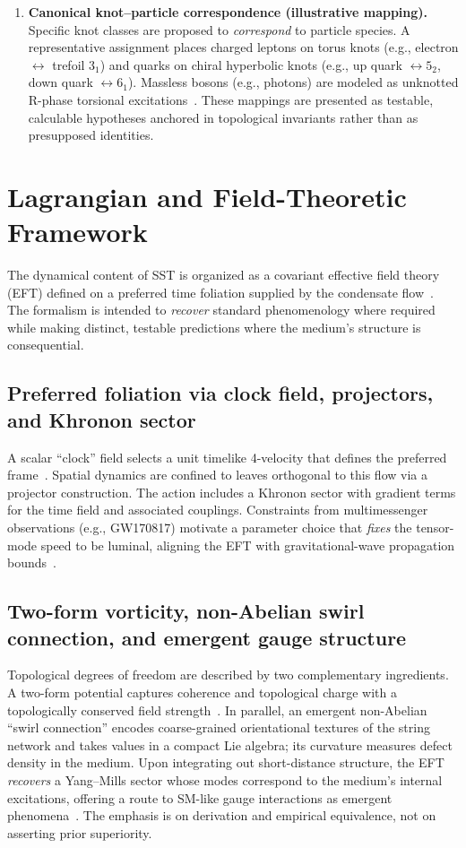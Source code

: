 \documentclass[10pt,reprint,aps,onecolumn,nofootinbib]{revtex4-2}
\begin{document}
\begin{enumerate}
        \item \textbf{Canonical knot–particle correspondence (illustrative mapping).} Specific knot classes are proposed to \emph{correspond} to particle species. A representative assignment places charged leptons on torus knots (e.g., electron $\leftrightarrow$ trefoil $3_1$) and quarks on chiral hyperbolic knots (e.g., up quark $\leftrightarrow 5_2$, down quark $\leftrightarrow 6_1$). Massless bosons (e.g., photons) are modeled as unknotted R-phase torsional excitations~\cite{1,4}. These mappings are presented as testable, calculable hypotheses anchored in topological invariants rather than as presupposed identities.
        \end{enumerate}

\section{Lagrangian and Field-Theoretic Framework}
    \label{sec:lagrangian}
    The dynamical content of SST is organized as a covariant effective field theory (EFT) defined on a preferred time foliation supplied by the condensate flow~\cite{4}. The formalism is intended to \emph{recover} standard phenomenology where required while making distinct, testable predictions where the medium’s structure is consequential.

    \subsection*{Preferred foliation via clock field, projectors, and Khronon sector}
        A scalar ``clock'' field selects a unit timelike 4-velocity that defines the preferred frame~\cite{4}. Spatial dynamics are confined to leaves orthogonal to this flow via a projector construction. The action includes a Khronon sector with gradient terms for the time field and associated couplings. Constraints from multimessenger observations (e.g., GW170817) motivate a parameter choice that \emph{fixes} the tensor-mode speed to be luminal, aligning the EFT with gravitational-wave propagation bounds~\cite{4}.

    \subsection*{Two-form vorticity, non-Abelian swirl connection, and emergent gauge structure}
        Topological degrees of freedom are described by two complementary ingredients. A two-form potential captures coherence and topological charge with a topologically conserved field strength~\cite{4}. In parallel, an emergent non-Abelian ``swirl connection'' encodes coarse-grained orientational textures of the string network and takes values in a compact Lie algebra; its curvature measures defect density in the medium. Upon integrating out short-distance structure, the EFT \emph{recovers} a Yang–Mills sector whose modes correspond to the medium’s internal excitations, offering a route to SM-like gauge interactions as emergent phenomena~\cite{1,4}. The emphasis is on derivation and empirical equivalence, not on asserting prior superiority.
\end{document}
